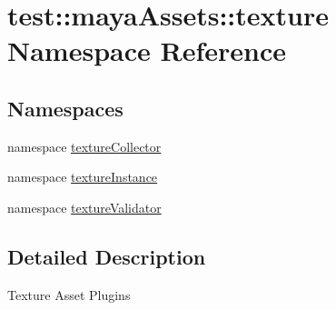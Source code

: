 \hypertarget{namespacetest_1_1mayaAssets_1_1texture}{\section{test\-:\-:maya\-Assets\-:\-:texture \-Namespace \-Reference}
\label{df/d3b/namespacetest_1_1mayaAssets_1_1texture}
}
\subsection*{\-Namespaces}
\begin{DoxyCompactItemize}
\item 
namespace \hyperlink{namespacetest_1_1mayaAssets_1_1texture_1_1textureCollector}{texture\-Collector}
\item 
namespace \hyperlink{namespacetest_1_1mayaAssets_1_1texture_1_1textureInstance}{texture\-Instance}
\item 
namespace \hyperlink{namespacetest_1_1mayaAssets_1_1texture_1_1textureValidator}{texture\-Validator}
\end{DoxyCompactItemize}


\subsection{\-Detailed \-Description}
\begin{DoxyVerb}
Texture Asset Plugins
\end{DoxyVerb}
 